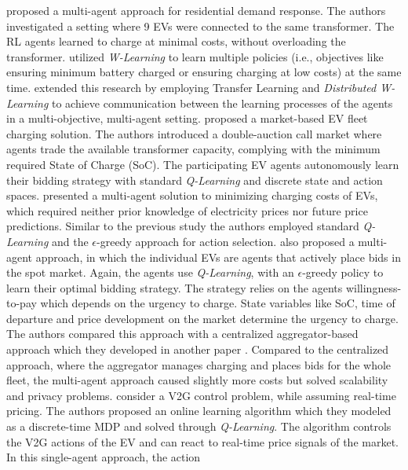 \documentclass[12pt, article]{article}
\begin{document}
\textcite{dusparic13_multi} proposed a multi-agent approach for residential demand
response. The authors investigated a setting where 9  EVs were connected to the
same transformer. The RL agents learned to charge at minimal costs, without
overloading the transformer. \textcite{dusparic13_multi} utilized \emph{W-Learning} to
learn multiple policies (i.e., objectives like ensuring minimum battery charged
or ensuring charging at low costs) at the same time.
\textcite{taylor14_accel_learn_trans_learn} extended this research by employing
Transfer Learning and \emph{Distributed W-Learning} to achieve communication between
the learning processes of the agents in a multi-objective, multi-agent setting.
\textcite{dauer13_market_based_ev_charg_coord} proposed a market-based EV fleet
charging solution. The authors introduced a double-auction call market where
agents trade the available transformer capacity, complying with the minimum
required State of Charge (SoC). The participating EV agents autonomously learn
their bidding strategy with standard \emph{Q-Learning} and discrete state and action
spaces. \textcite{giorgio13_elect_vehic} presented a multi-agent solution to
minimizing charging costs of EVs, which required neither prior knowledge of
electricity prices nor future price predictions. Similar to the previous study
the authors employed standard \emph{Q-Learning} and the \(\epsilon\)-greedy approach for
action selection. \textcite{vaya14_optim} also proposed a multi-agent approach, in
which the individual EVs are agents that actively place bids in the spot market.
Again, the agents use \emph{Q-Learning}, with an \(\epsilon\)-greedy policy to learn
their optimal bidding strategy. The strategy relies on the agents
willingness-to-pay which depends on the urgency to charge. State variables like
SoC, time of departure and price development on the market determine the urgency
to charge. The authors compared this approach with a centralized
aggregator-based approach which they developed in another paper
\parencite{vaya15_optim_biddin_strat_plug_in}. Compared to the centralized
approach, where the aggregator manages charging and places bids for the whole
fleet, the multi-agent approach caused slightly more costs but solved
scalability and privacy problems. \textcite{shi11_real} consider a V2G control
problem, while assuming real-time pricing. The authors proposed an online learning
algorithm which they modeled as a discrete-time MDP and solved through
\emph{Q-Learning}. The algorithm controls the V2G actions of the EV and can react to
real-time price signals of the market. In this single-agent approach, the action
\end{document}
